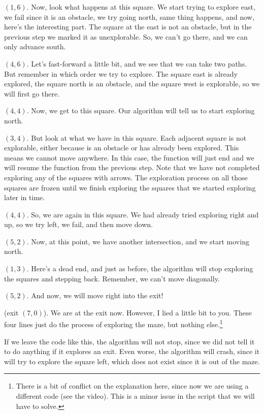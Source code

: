 \documentclass[12pt]{article}
\begin{document}
$(1, 6)$. Now, look what happens at this square. We start
trying to explore east, we fail since it is an obstacle,
we try going north, same thing happens, and now, here's
the interesting part. The square at the east is not an obstacle,
but in the previous step we marked it as unexplorable. So,
we can't go there, and we can only advance south.

$(4, 6)$. Let's fast-forward a little bit, and we see that we
can take two paths. But remember in which order we try to explore.
The square east is already explored, the square north is an
obstacle, and the square west is explorable, so we will
first go there.

$(4, 4)$. Now, we get to this square. Our algorithm will tell
us to start exploring north.

$(3, 4)$. But look at what we have in this square. Each adjacent
square is not explorable, either because is an obstacle or
has already been explored. This means we cannot move anywhere.
In this case, the function will just end and we will resume
the function from the previous step.
Note that we have not completed exploring any of the squares
with arrows. The exploration process on all those squares are
frozen until we finish exploring the squares that we started
exploring later in time.

$(4, 4)$. So, we are again in this square. We had already tried
exploring right and up, so we try left, we fail, and then move
down.

$(5, 2)$. Now, at this point, we have another intersection,
and we start moving north.

$(1, 3)$. Here's a dead end, and just as before, the algorithm
will stop exploring the squares and stepping back.
Remember, we can't move diagonally.

$(5, 2)$. And now, we will move right into the exit!

(exit $(7, 0)$). We are at the exit now. However, I lied a
little bit to you. These four lines just do the process of
exploring the maze, but nothing else.\footnote{There is a bit of conflict on the
explanation here, since now we are using a different code (see the video).
This is a minor issue in the script that we will have to solve.}

If we leave the code like this, the algorithm will not stop,
since we did not tell it to do anything if it explores an
exit. Even worse, the algorithm will crash, since it will
try to explore the square left, which does not 
exist since it is out of the maze.
\end{document}
